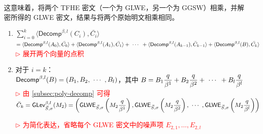 这意味着，将两个 TFHE 密文（一个为 GLWE，另一个为 GGSW）相乘，并解密所得的 GLWE 密文，结果与将两个原始明文相乘相同。


\begin{myproof}
\begin{enumerate}
\item $\sum\limits_{i=0}^{k}\langle \textsf{Decomp}^{\beta, l}(C_i), \bar{C_i} \rangle$ \\
$= \langle \textsf{Decomp}^{\beta, l}(A_0), \bar{C_0} \rangle + \langle \textsf{Decomp}^{\beta, l}(A_1), \bar{C_1} \rangle + \text{ } \text{$\cdots$} \text{ } + \langle \textsf{Decomp}^{\beta, l}(A_{k-1}), \bar{C}_{k-1} \rangle + \langle \textsf{Decomp}^{\beta, l}(B), \bar{C_k} \rangle$ \\
\textcolor{red}{ $\rhd$ 展开两个向量的点积}
\item 对于 $i = k$： \\
$\textsf{Decomp}^{\beta, l}(B) = (B_1, B_2, \text{ } \text{$\cdots$} \text{ }, B_l)$，其中 $B = B_1\dfrac{q}{\beta^1} + B_2\dfrac{q}{\beta^2} + \text{ } \text{$\cdots$} \text{ } + B_l\dfrac{q}{\beta^l}$ \textcolor{red}{ $\rhd$ 由 \autoref{subsec:poly-decomp} 可得}\\
$\bar{C}_k = \textsf{GLev}_{\vec{S}, \sigma}^{\beta, l}(M_2) = \left(\textsf{GLWE}_{\vec{S}, \sigma}\left(M_{2}\dfrac{q}{\beta^1}\right), \textsf{GLWE}_{\vec{S}, \sigma}\left(M_{2}\dfrac{q}{\beta^2}\right), \text{ } \text{$\cdots$} \text{ }, \textsf{GLWE}_{\vec{S}, \sigma}\left(M_{2}\dfrac{q}{\beta^l}\right) \right)$ 

\textcolor{red}{ $\rhd$ 为简化表达，省略每个 GLWE 密文中的噪声项 $E_{2,1}, \ldots, E_{2,l}$} \\
$ $


\end{enumerate}
\end{myproof}
